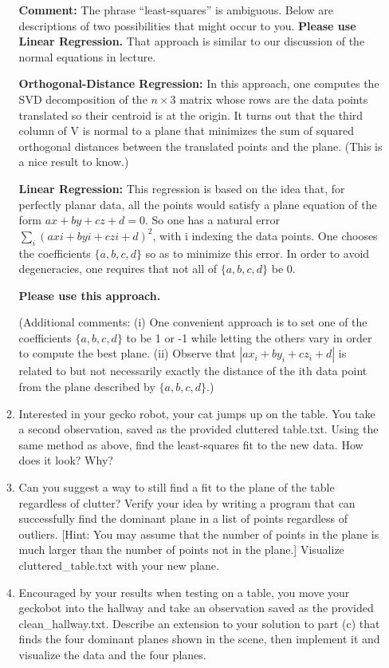 \documentclass[conference,onecolumn]{IEEEtran}
\begin{document}
\begin{enumerate}[label=\arabic{enumi}.]
\begin{enumerate}
                        \textbf{Comment:} The phrase “least-squares” is ambiguous. Below are descriptions of two possibilities that might occur to you.
                        \textbf{Please use Linear Regression.}
                        That approach is similar to our discussion of the normal equations in lecture.

                        \textbf{Orthogonal-Distance Regression:} In this approach, one computes the SVD decomposition of the $n \times 3$ matrix whose rows are the data points translated so their centroid is at the origin.
                        It turns out that the third column of V is normal to a plane that minimizes the sum of squared orthogonal distances between the translated points and the plane.
                        (This is a nice result to know.)

                        \textbf{Linear Regression:} This regression is based on the idea that, for perfectly planar data, all the points would satisfy a plane equation of the form $ax + by + cz + d = 0$.
                        So one has a natural error $\sum_i (axi + byi + czi + d)^2$, with i indexing the data points.
                        One chooses the coefficients $\{a, b, c, d\}$ so as to minimize this error.
                        In order to avoid degeneracies, one requires that not all of $\{a, b, c, d\}$ be 0.

                        \textbf{Please use this approach.}

                        (Additional comments: (i) One convenient approach is to set one of the coefficients $\{a, b, c, d\}$ to be 1 or -1 while letting the others vary in order to compute the best plane.
                        (ii) Observe that $|ax_i + by_i + cz_i + d|$ is related to but not necessarily exactly the distance of the ith data point from the plane described by $\{a, b, c, d\}$.)
                  \item Interested in your gecko robot, your cat jumps up on the table.
                        You take a second observation, saved as the provided cluttered table.txt.
                        Using the same method as above, find the least-squares fit to the new data.
                        How does it look? Why?
                  \item Can you suggest a way to still find a fit to the plane of the table regardless of clutter?
                        Verify your idea by writing a program that can successfully find the dominant plane in a list of points regardless of outliers.
                              [Hint: You may assume that the number of points in the plane is much larger than the number of points not in the plane.]
                        Visualize cluttered\_table.txt with your new plane.
                  \item Encouraged by your results when testing on a table, you move your geckobot into the hallway and take an observation saved as the provided clean\_hallway.txt.
                        Describe an extension to your solution to part (c) that finds the four dominant planes shown in the scene, then implement it and visualize the data and the four planes.


\end{enumerate}
\end{enumerate}
\end{document}
